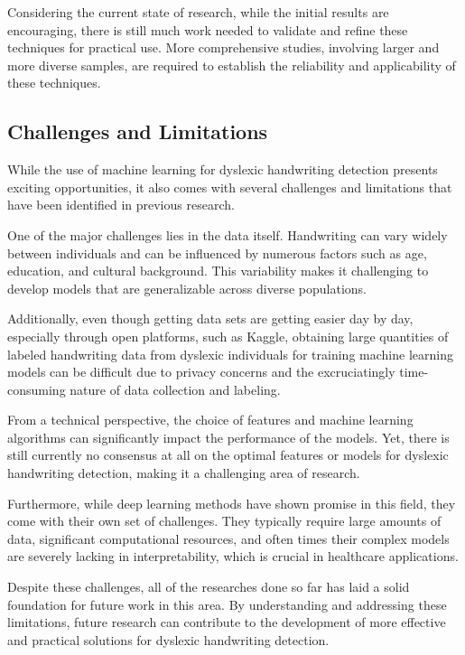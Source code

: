 Considering the current state of research, while the initial results are encouraging, there is still much work needed to validate and refine these techniques for practical use. More comprehensive studies, involving larger and more diverse samples, are required to establish the reliability and applicability of these techniques.

\newpage
\subsection{Challenges and Limitations}
While the use of machine learning for dyslexic handwriting detection presents exciting opportunities, it also comes with several challenges and limitations that have been identified in previous research.

One of the major challenges lies in the data itself. Handwriting can vary widely between individuals and can be influenced by numerous factors such as age, education, and cultural background. This variability makes it challenging to develop models that are generalizable across diverse populations.

Additionally, even though getting data sets are getting easier day by day, especially through open platforms, such as Kaggle, obtaining large quantities of labeled handwriting data from dyslexic individuals for training machine learning models can be difficult due to privacy concerns and the excruciatingly time-consuming nature of data collection and labeling.

From a technical perspective, the choice of features and machine learning algorithms can significantly impact the performance of the models. Yet, there is still currently no consensus at all on the optimal features or models for dyslexic handwriting detection, making it a challenging area of research.

Furthermore, while deep learning methods have shown promise in this field, they come with their own set of challenges. They typically require large amounts of data, significant computational resources, and often times their complex models are severely lacking in interpretability, which is crucial in healthcare applications.

Despite these challenges, all of the researches done so far has laid a solid foundation for future work in this area. By understanding and addressing these limitations, future research can contribute to the development of more effective and practical solutions for dyslexic handwriting detection.

